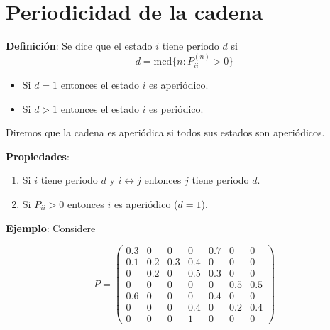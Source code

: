 \documentclass[12pt,a4paper]{article}
\newcommand{\definicion}[1]{%
\begin{definicionbox}
\textbf{Definición}: #1
\end{definicionbox}
}
\begin{document}
\section*{Periodicidad de la cadena}

\definicion{Se dice que el estado $i$ tiene periodo $d$ si
\begin{equation}
d = \text{mcd} \{n: P_{ii}^{(n)} > 0\}
\end{equation}

\begin{itemize}
    \item Si $d=1$ entonces el estado $i$ es aperiódico.
    \item Si $d>1$ entonces el estado $i$ es periódico.
\end{itemize}

Diremos que la cadena es aperiódica si todos sus estados son aperiódicos.

}

\textbf{Propiedades}:

\begin{enumerate}
    \item Si $i$ tiene periodo $d$ y $i \leftrightarrow j$ entonces $j$ tiene periodo $d$.
    \item Si $P_{ii} > 0$ entonces $i$ es aperiódico ($d=1$).
\end{enumerate}

\textbf{Ejemplo}: Considere

\begin{equation*}
P = \begin{pmatrix}
0.3 & 0 & 0 & 0 & 0.7 & 0 & 0 \\
0.1 & 0.2 & 0.3 & 0.4 & 0 & 0 & 0 \\
0 & 0.2 & 0 & 0.5 & 0.3 & 0 & 0 \\
0 & 0 & 0 & 0 & 0 & 0.5 & 0.5 \\
0.6 & 0 & 0 & 0 & 0.4 & 0 & 0 \\
0 & 0 & 0 & 0.4 & 0 & 0.2 & 0.4 \\
0 & 0 & 0 & 1 & 0 & 0 & 0
\end{pmatrix}
\end{equation*}
\end{document}

